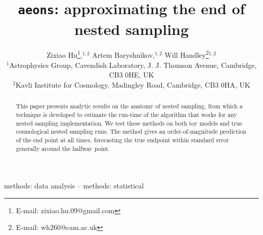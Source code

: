 \documentclass[usenatbib]{mnras}
\title[\texttt{aeons}]{\texttt{aeons}: approximating the end of nested sampling}
\author[Z. Hu et al.]{Zixiao Hu\thanks{E-mail: zixiao.hu.09@gmail.com},$^{1,2}$  Artem Baryshnikov,$^{1,2}$  Will Handley\thanks{E-mail: wh260@cam.ac.uk}$^{1,2}$
\\
$^{1}$Astrophysics Group, Cavendish Laboratory, J. J. Thomson Avenue, Cambridge, CB3 0HE, UK\\
$^{2}$Kavli Institute for Cosmology, Madingley Road, Cambridge, CB3 0HA, UK
}
\begin{document}
\label{firstpage}
\pagerange{\pageref{firstpage}--\pageref{lastpage}}
\maketitle


\begin{abstract}
    This paper presents analytic results on the anatomy of nested sampling, from which a technique is developed to estimate the run-time of the algorithm that works for any nested sampling implementation. We test these methods on both toy models and true cosmological nested sampling runs. The method gives an order-of-magnitude prediction of the end point at all times, forecasting the true endpoint within standard error generally around the halfway point.  
\end{abstract}

\begin{keywords}
methods: data analysis -- methods: statistical
\end{keywords}
\end{document}
